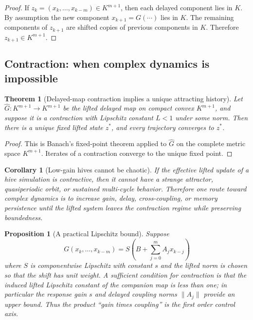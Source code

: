 \documentclass[11pt]{article}
\newtheorem{theorem}{Theorem}
\newtheorem{proposition}{Proposition}
\newtheorem{corollary}{Corollary}
\begin{document}
\begin{proof}
If $z_k=(x_k,\ldots,x_{k-m})\in K^{m+1}$, then each delayed component lies in $K$.
By assumption the new component $x_{k+1}=G(\cdots)$ lies in $K$.  The remaining
components of $z_{k+1}$ are shifted copies of previous components in $K$.
Therefore $z_{k+1}\in K^{m+1}$.
\end{proof}

\subsection{Contraction: when complex dynamics is impossible}

\begin{theorem}[Delayed-map contraction implies a unique attracting history]
Let $\widehat G:K^{m+1}\to K^{m+1}$ be the lifted delayed map on compact convex
$K^{m+1}$, and suppose it is a contraction with Lipschitz constant $L<1$ under
some norm.  Then there is a unique fixed lifted state $z^\ast$, and every
trajectory converges to $z^\ast$.
\end{theorem}

\begin{proof}
This is Banach's fixed-point theorem applied to $\widehat G$ on the complete
metric space $K^{m+1}$.  Iterates of a contraction converge to the unique fixed
point.
\end{proof}

\begin{corollary}[Low-gain hives cannot be chaotic]
If the effective lifted update of a hive simulation is contractive, then it cannot
have a strange attractor, quasiperiodic orbit, or sustained multi-cycle behavior.
Therefore one route toward complex dynamics is to increase gain, delay,
cross-coupling, or memory persistence until the lifted system leaves the
contraction regime while preserving boundedness.
\end{corollary}

\begin{proposition}[A practical Lipschitz bound]
Suppose
\[
  G(x_k,\ldots,x_{k-m})=S\left(B+\sum_{j=0}^m A_j x_{k-j}\right)
\]
where $S$ is componentwise Lipschitz with constant $s$ and the lifted norm is
chosen so that the shift has unit weight.  A sufficient condition for contraction
is that the induced lifted Lipschitz constant of the companion map is less than
one; in particular the response gain $s$ and delayed coupling norms $\|A_j\|$
provide an upper bound.  Thus the product ``gain times coupling'' is the first
order control axis.
\end{proposition}
\end{document}
